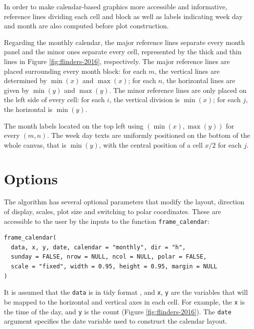 \documentclass[12pt]{article}
\begin{document}
In order to make calendar-based graphics more accessible and
informative, reference lines dividing each cell and block as well as
labels indicating week day and month are also computed before plot
construction.

Regarding the monthly calendar, the major reference lines separate every
month panel and the minor ones separate every cell, represented by the
thick and thin lines in Figure \ref{fig:flinders-2016}, respectively.
The major reference lines are placed surrounding every month block: for
each \(m\), the vertical lines are determined by \(\min{(x)}\) and
\(\max{(x)}\); for each \(n\), the horizontal lines are given by
\(\min{(y)}\) and \(\max{(y)}\). The minor reference lines are only
placed on the left side of every cell: for each \(i\), the vertical
division is \(\min{(x)}\); for each \(j\), the horizontal is
\(\min{(y)}\).

The month labels located on the top left using
\((\min{(x)}, \max{(y)})\) for every \((m, n)\). The week day texts are
uniformly positioned on the bottom of the whole canvas, that is
\(\min{(y)}\), with the central position of a cell \(x / 2\) for each
\(j\).

\hypertarget{options}{%
\section{Options}\label{options}}

\label{sec:opt}

The algorithm has several optional parameters that modify the layout,
direction of display, scales, plot size and switching to polar
coordinates. These are accessible to the user by the inputs to the
function \texttt{frame\_calendar}:

\begin{verbatim}
frame_calendar(
  data, x, y, date, calendar = "monthly", dir = "h", 
  sunday = FALSE, nrow = NULL, ncol = NULL, polar = FALSE, 
  scale = "fixed", width = 0.95, height = 0.95, margin = NULL
)
\end{verbatim}

It is assumed that the \texttt{data} is in tidy format
\citep{wickham2014tidy}, and \texttt{x}, \texttt{y} are the variables
that will be mapped to the horizontal and vertical axes in each cell.
For example, the \texttt{x} is the time of the day, and \texttt{y} is
the count (Figure \ref{fig:flinders-2016}). The \texttt{date} argument
specifies the date variable used to construct the calendar layout.
\end{document}
